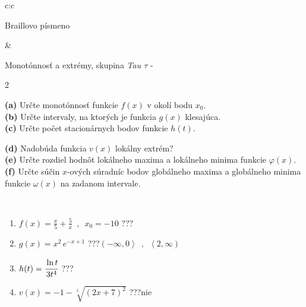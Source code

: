 \documentclass[10pt]{report}
\begin{document}
\begin{tabular}{c:c}
\begin{minipage}[c][104.5mm][t]{0.5\linewidth}
\begin{center}
\begin{minipage}{0.20\linewidth}
\begin{center}
{\small Braillovo písmeno}
\end{center}
\end{minipage}
\end{center}
\end{minipage}
&
\begin{minipage}[c][104.5mm][t]{0.5\linewidth}
\begin{center}
\vspace{7mm}
{\huge Monotónnosť a extrémy, skupina \textit{Tau $\tau$} -}\\[5mm]
\begin{minipage}{0.95\linewidth}
\begin{center}
{\small \begin{multicols}{2} \raggedright
\textbf{(a)} Určte monotónnosť funkcie \(f(x)\) v okolí bodu \(x_0\). \\[1mm]
\textbf{(b)} Určte intervaly, na ktorých je funkcia \(g(x)\) klesajúca. \\[1mm]
\textbf{(c)} Určte počet stacionárnych bodov funkcie \(h(t)\). \par \columnbreak
\textbf{(d)} Nadobúda funkcia \(v(x)\) lokálny extrém? \\[1mm]
\textbf{(e)} Určte rozdiel hodnôt lokálneho maxima a lokálneho minima funkcie \(\varphi(x)\). \\[1mm]
\textbf{(f)} Určte súčin \(x\)-ových súradníc bodov globálneho maxima a globálneho minima funkcie \(\omega(x)\) na zadanom intervale. \\[1mm]
\end{multicols}
}
\end{center}
\end{minipage}
\\[4mm]
\begin{minipage}{0.79\linewidth}
\begin{center}
\begin{varwidth}{\linewidth}
\begin{enumerate}
\normalsize
\item $f(x)=\frac{x}{5}+\frac{5}{x} \enspace , \enspace x_0=-10$\quad \dotfill\; ???\;\dotfill \quad {}
\item $g(x)=x^2\, e^{-x+1}$\quad \dotfill\; ???\;\dotfill \quad $\left(-\infty , 0\right\rangle\enspace , \enspace \left\langle2 , \infty\right)$
\item $h(t)=\cfrac{\ln t}{3t^4}$\quad \dotfill\; ???\;\dotfill {}
\item $v(x)=-1-\sqrt[5]{(2x+7)^2}$\quad \dotfill\; ???\;\dotfill \quad $\text{nie}$

\end{enumerate}
\end{varwidth}
\end{center}
\end{minipage}
\end{center}
\end{minipage}
\end{tabular}
\end{document}
